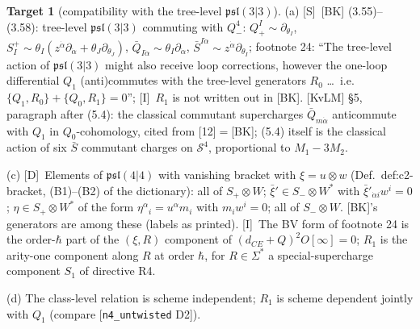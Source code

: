 \documentclass[11pt]{article}
\theoremstyle{definition}
\newtheorem{target}{Target}
\newcommand{\Sl}{\textup{[S]}}
\newcommand{\Dl}{\textup{[D]}}
\newcommand{\Il}{\textup{[I]}}
\begin{document}
\begin{target}[compatibility with the tree-level $\mathfrak{psl}(3|3)$]\label{t:psl33}
(a) \Sl\ [BK] (3.55)--(3.58): tree-level $\mathfrak{psl}(3|3)$ commuting with $Q^4_-$: $Q^I_+\sim\partial_{\theta_I}$, $S^+_I\sim\theta_I(z^{\dot\alpha}\partial_{\dot\alpha}+\theta_J\partial_{\theta_J})$, $\bar Q_{I\dot\alpha}\sim\theta_I\partial_{\dot\alpha}$, $\bar S^{I\dot\alpha}\sim z^{\dot\alpha}\partial_{\theta_I}$; footnote 24: ``The tree-level action of $\mathfrak{psl}(3|3)$ might also receive loop corrections, however the one-loop differential $Q_1$ (anti)commutes with the tree-level generators $R_0$ \dots\ i.e.\ $\{Q_1,R_0\}+\{Q_0,R_1\}=0$''; \Il\ $R_1$ is not written out in [BK]. [KvLM] \S5, paragraph after (5.4): the classical commutant supercharges $\bar Q_{m\dot\alpha}$ anticommute with $Q_1$ in $Q_0$-cohomology, cited from [12]$=$[BK]; (5.4) itself is the classical action of six $\bar S$ commutant charges on $\mathcal S^4$, proportional to $M_1-3M_2$.

(c) \Dl\ Elements of $\mathfrak{psl}(4|4)$ with vanishing bracket with $\xi=u\otimes w$ (Def.~def:c2-bracket, (B1)--(B2) of the dictionary): all of $S_+\otimes W$; $\bar\xi'\in S_-\otimes W^*$ with $\bar\xi'_{\dot\alpha i}w^i=0$; $\eta\in S_+\otimes W^*$ of the form $\eta^\alpha{}_i=u^\alpha m_i$ with $m_iw^i=0$; all of $S_-\otimes W$. [BK]'s generators are among these (labels as printed). \Il\ The BV form of footnote 24 is the order-$\hbar$ part of the $(\xi,R)$ component of $(d_{CE}+Q)^2O[\infty]=0$; $R_1$ is the arity-one component along $R$ at order $\hbar$, for $R\in\Sigma^*$ a special-supercharge component $S_1$ of directive R4.

(d) The class-level relation is scheme independent; $R_1$ is scheme dependent jointly with $Q_1$ (compare [\texttt{n4\_untwisted} D2]).
\end{target}
\end{document}
